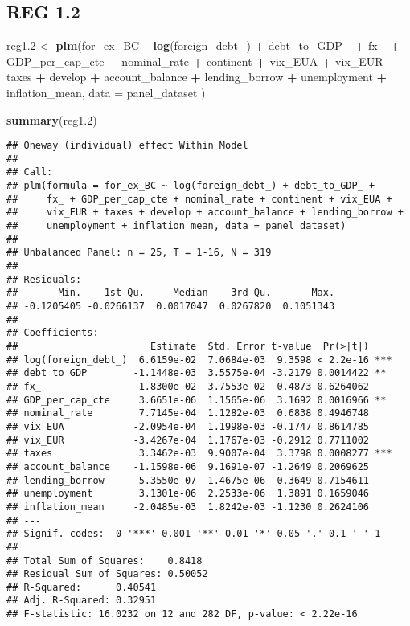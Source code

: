 \documentclass[]{article}
\newenvironment{Shaded}{\begin{snugshade}}{\end{snugshade}}
\newcommand{\KeywordTok}[1]{\textcolor[rgb]{0.13,0.29,0.53}{\textbf{#1}}}
\newcommand{\DataTypeTok}[1]{\textcolor[rgb]{0.13,0.29,0.53}{#1}}
\newcommand{\DecValTok}[1]{\textcolor[rgb]{0.00,0.00,0.81}{#1}}
\newcommand{\StringTok}[1]{\textcolor[rgb]{0.31,0.60,0.02}{#1}}
\newcommand{\OperatorTok}[1]{\textcolor[rgb]{0.81,0.36,0.00}{\textbf{#1}}}
\newcommand{\NormalTok}[1]{#1}
\begin{document}
\subsection{REG 1.2}\label{reg-1.2}

\begin{Shaded}
\begin{Highlighting}[]
\NormalTok{reg1.}\DecValTok{2}\NormalTok{ <-}\StringTok{ }\KeywordTok{plm}\NormalTok{(for_ex_BC }\OperatorTok{~}\StringTok{ }\KeywordTok{log}\NormalTok{(foreign_debt_) }\OperatorTok{+}\StringTok{ }\NormalTok{debt_to_GDP_ }\OperatorTok{+}\StringTok{ }\NormalTok{fx_ }\OperatorTok{+}\StringTok{ }\NormalTok{GDP_per_cap_cte }\OperatorTok{+}\StringTok{ }\NormalTok{nominal_rate }\OperatorTok{+}\StringTok{ }\NormalTok{continent }\OperatorTok{+}\StringTok{ }\NormalTok{vix_EUA }\OperatorTok{+}\StringTok{ }\NormalTok{vix_EUR }\OperatorTok{+}\StringTok{ }\NormalTok{taxes }\OperatorTok{+}\StringTok{ }\NormalTok{develop }\OperatorTok{+}\StringTok{ }\NormalTok{account_balance }\OperatorTok{+}\StringTok{ }\NormalTok{lending_borrow }\OperatorTok{+}\StringTok{ }\NormalTok{unemployment }\OperatorTok{+}\StringTok{ }\NormalTok{inflation_mean, }\DataTypeTok{data =}\NormalTok{ panel_dataset )}

\KeywordTok{summary}\NormalTok{(reg1.}\DecValTok{2}\NormalTok{)}
\end{Highlighting}
\end{Shaded}

\begin{verbatim}
## Oneway (individual) effect Within Model
## 
## Call:
## plm(formula = for_ex_BC ~ log(foreign_debt_) + debt_to_GDP_ + 
##     fx_ + GDP_per_cap_cte + nominal_rate + continent + vix_EUA + 
##     vix_EUR + taxes + develop + account_balance + lending_borrow + 
##     unemployment + inflation_mean, data = panel_dataset)
## 
## Unbalanced Panel: n = 25, T = 1-16, N = 319
## 
## Residuals:
##       Min.    1st Qu.     Median    3rd Qu.       Max. 
## -0.1205405 -0.0266137  0.0017047  0.0267820  0.1051343 
## 
## Coefficients:
##                       Estimate  Std. Error t-value  Pr(>|t|)    
## log(foreign_debt_)  6.6159e-02  7.0684e-03  9.3598 < 2.2e-16 ***
## debt_to_GDP_       -1.1448e-03  3.5575e-04 -3.2179 0.0014422 ** 
## fx_                -1.8300e-02  3.7553e-02 -0.4873 0.6264062    
## GDP_per_cap_cte     3.6651e-06  1.1565e-06  3.1692 0.0016966 ** 
## nominal_rate        7.7145e-04  1.1282e-03  0.6838 0.4946748    
## vix_EUA            -2.0954e-04  1.1998e-03 -0.1747 0.8614785    
## vix_EUR            -3.4267e-04  1.1767e-03 -0.2912 0.7711002    
## taxes               3.3462e-03  9.9007e-04  3.3798 0.0008277 ***
## account_balance    -1.1598e-06  9.1691e-07 -1.2649 0.2069625    
## lending_borrow     -5.3550e-07  1.4675e-06 -0.3649 0.7154611    
## unemployment        3.1301e-06  2.2533e-06  1.3891 0.1659046    
## inflation_mean     -2.0485e-03  1.8242e-03 -1.1230 0.2624106    
## ---
## Signif. codes:  0 '***' 0.001 '**' 0.01 '*' 0.05 '.' 0.1 ' ' 1
## 
## Total Sum of Squares:    0.8418
## Residual Sum of Squares: 0.50052
## R-Squared:      0.40541
## Adj. R-Squared: 0.32951
## F-statistic: 16.0232 on 12 and 282 DF, p-value: < 2.22e-16
\end{verbatim}
\end{document}
